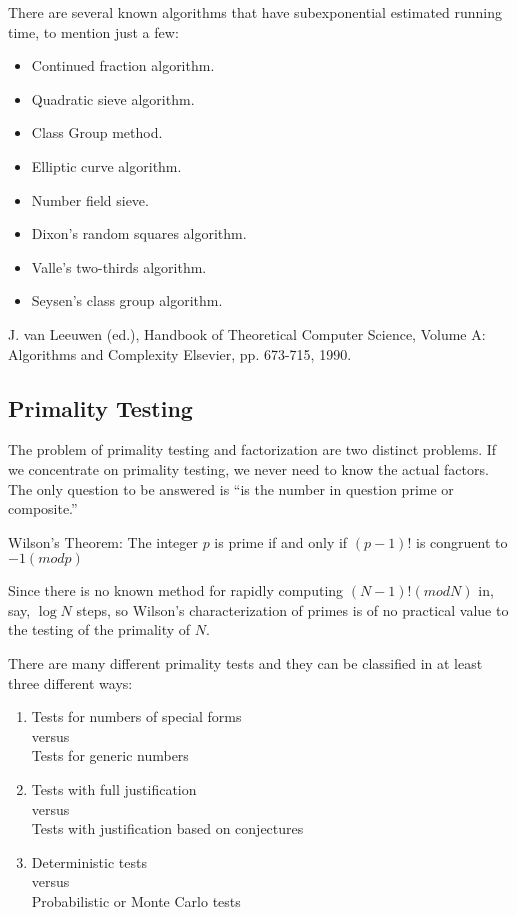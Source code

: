 There are several known algorithms that have subexponential estimated 
    running time, to mention just a few:

\begin{itemize}
\item Continued fraction algorithm.
        \item Quadratic sieve algorithm.
        \item Class Group method.
        \item Elliptic curve algorithm.
        \item Number field sieve.
        \item Dixon's random squares algorithm.
        \item Valle's two-thirds algorithm.
        \item Seysen's class group algorithm.
\end{itemize}


\Ref

    {J. van Leeuwen (ed.), Handbook of Theoretical Computer 
    Science, Volume A: Algorithms and Complexity}{ Elsevier, pp. 
    673-715, 1990.}

\subsection{Primality Testing}

The problem of primality testing and factorization are two distinct
problems. If we concentrate on primality testing, we never need to know
the actual factors. The only question to be answered is ``is the number
in question prime or composite.''


Wilson's Theorem: The integer $p$ is prime if and only if
$(p-1)!$ is congruent to $-1 (mod p)$

Since there is no known method for rapidly computing $(N-1)! (mod N)$ in,
say, $\log N$ steps, so Wilson's characterization of primes is of no
practical value to the testing of the primality of $N$.


There are many different primality tests and they can be classified in
at least three different ways:

\begin{enumerate}
\item Tests for numbers of special forms \\
           versus \\
   Tests for generic numbers
\item Tests with full justification \\
           versus\\
   Tests with justification based on conjectures
\item Deterministic tests\\
           versus \\
   Probabilistic or Monte Carlo tests
\end{enumerate}

